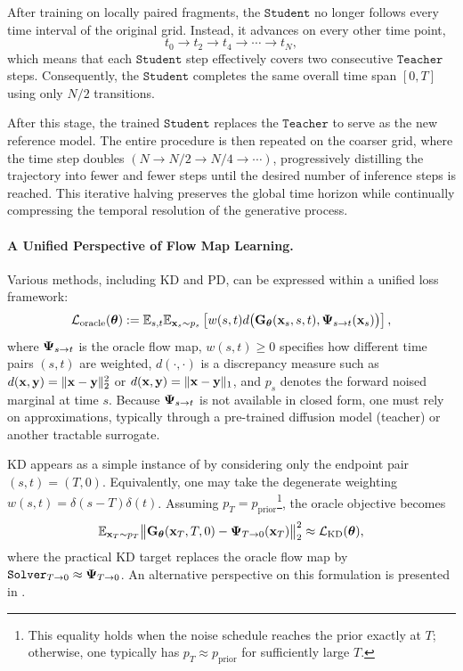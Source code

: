 After training on locally paired fragments, the $ \mathtt{Student} $ no longer follows every time interval of the original grid. 
Instead, it advances on every other time point,
\[
t_0 \to t_2 \to t_4 \to \cdots \to t_N,
\]
which means that each $ \mathtt{Student} $ step effectively covers two consecutive $ \mathtt{Teacher}$  steps. 
Consequently, the $ \mathtt{Student} $ completes the same overall time span $[0,T]$ using only $N/2$ transitions. 

After this stage, the trained $ \mathtt{Student} $ replaces the $ \mathtt{Teacher}$  to serve as the new reference model. 
The entire procedure is then repeated on the coarser grid, where the time step doubles 
$(N \to N/2 \to N/4 \to \cdots)$,
progressively distilling the trajectory into fewer and fewer steps until the desired number of inference steps is reached. 
This iterative halving preserves the global time horizon while continually compressing the temporal resolution of the generative process.






\paragraph{A Unified Perspective of Flow Map Learning.}
Various methods, including KD and PD, can be expressed within a unified loss framework:
\begin{align}\label{eq:general-cm-loss}
  \mathcal{L}_{\mathrm{oracle}}({\bm{\theta}})
  := \mathbb{E}_{s,t} \mathbb{E}_{{\mathbf{x}}_s \sim p_s} 
  \left[  w(s,t)  d \big({\mathbf{G}}_{\bm{\theta}}({\mathbf{x}}_s, s,t),  {\bm{\Psi}}_{s\to t}({\mathbf{x}}_s)\big)\right],
\end{align}
where ${\bm{\Psi}}_{s\to t}$ is the oracle flow map, $w(s,t) \geq 0$ specifies how different time pairs $(s,t)$ are weighted,
$d(\cdot,\cdot)$ is a discrepancy measure such as
$d({\mathbf{x}},{\mathbf{y}})=\|{\mathbf{x}}-{\mathbf{y}}\|_2^2$ or $d({\mathbf{x}},{\mathbf{y}})=\|{\mathbf{x}}-{\mathbf{y}}\|_1$,  and $p_s$ denotes the
forward noised marginal at time $s$. Because ${\bm{\Psi}}_{s\to t}$ is not available
in closed form, one must rely on approximations, typically through a pre-trained
diffusion model (teacher) or another tractable surrogate.

KD appears as a simple instance of  by considering only the endpoint pair $(s,t)=(T,0)$. Equivalently, one may take the degenerate weighting
$w(s,t)=\delta(s{-}T)\delta(t)$.
Assuming $p_T=p_{\mathrm{prior}}$\footnote{This equality holds when the noise schedule reaches the prior exactly at $T$; otherwise, one typically has $p_T\approx p_{\mathrm{prior}}$ for sufficiently large $T$.}, the oracle objective becomes
\[
\mathbb{E}_{{\mathbf{x}}_T\sim p_T}
\big\|{\mathbf{G}}_{\bm{\theta}}({\mathbf{x}}_T,T,0)-{\bm{\Psi}}_{T\to 0}({\mathbf{x}}_T)\big\|_2^2
\approx \mathcal{L}_{\mathrm{KD}}({\bm{\theta}}),
\]
where the practical KD target replaces the oracle flow map by
$\mathtt{Solver}_{T\to 0}\approx{\bm{\Psi}}_{T\to 0}$.
An alternative perspective on this formulation is presented in
.


